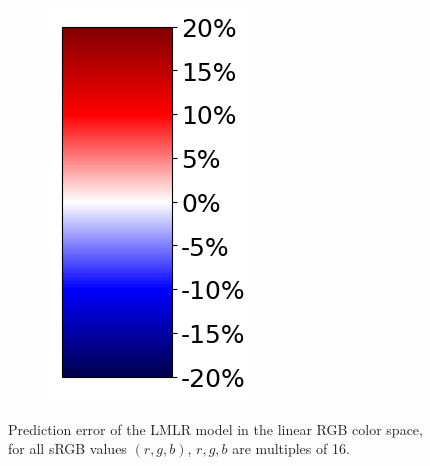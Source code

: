 \begin{figure}[tp]
\begin{subfigure}[]{0.15\columnwidth}
		\includegraphics[width=0.8\linewidth]{figure/004_error_bar.png}
	\end{subfigure}
        \vspace{-0.1in}
	\caption{Prediction error of the LMLR model in the linear RGB
          color space, for all sRGB values $(r, g, b)$, $r, g, b$
          are multiples of 16.}
        \vspace{-0.2in}
	\label{fig:error_wrt_linear}
\end{figure}


